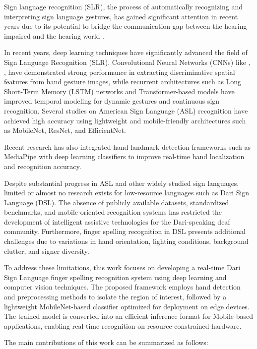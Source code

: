 Sign language recognition (SLR), the process of automatically recognizing and interpreting sign language gestures, has gained significant attention in recent years due to its potential to bridge the communication gap between the hearing impaired and the hearing world \cite{bibid}.

In recent years, deep learning techniques have significantly advanced the field of Sign Language Recognition (SLR). Convolutional Neural Networks (CNNs) \cite{bibid} like \cite{bibid}, \cite{bibid}, \cite{bibid} have demonstrated strong performance in extracting discriminative spatial features from hand gesture images, while recurrent architectures such as Long Short-Term Memory (LSTM) \cite{bibid} networks and Transformer-based models have improved temporal modeling for dynamic gestures and continuous sign recognition. Several studies on American Sign Language (ASL) recognition have achieved high accuracy using lightweight and mobile-friendly architectures such as MobileNet, ResNet, and EfficientNet.


Recent research has also integrated hand landmark detection frameworks such as MediaPipe with deep learning classifiers to improve real-time hand localization and recognition accuracy.


Despite substantial progress in ASL and other widely studied sign languages, limited or almost no research exists for low-resource languages such as Dari Sign Language (DSL). The absence of publicly available datasets, standardized benchmarks, and mobile-oriented recognition systems has restricted the development of intelligent assistive technologies for the Dari-speaking deaf community. Furthermore, finger spelling recognition in DSL presents additional challenges due to variations in hand orientation, lighting conditions, background clutter, and signer diversity.

To address these limitations, this work focuses on developing a real-time Dari Sign Language finger spelling recognition system using deep learning and computer vision techniques. The proposed framework employs hand detection and preprocessing methods to isolate the region of interest, followed by a lightweight MobileNet-based classifier optimized for deployment on edge devices. The trained model is converted into an efficient inference format for Mobile-based applications, enabling real-time recognition on resource-constrained hardware.

The main contributions of this work can be summarized as follows:

